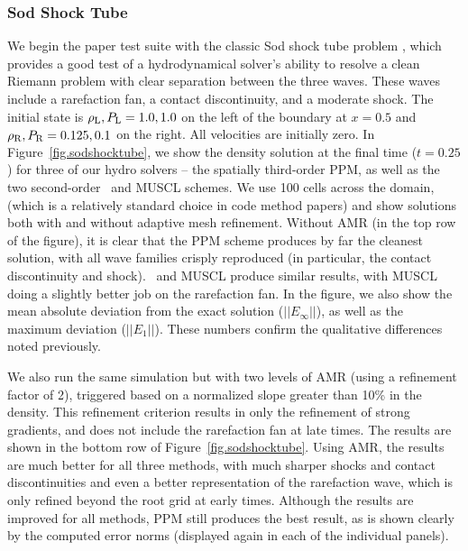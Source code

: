 \subsubsection{Sod Shock Tube}
\label{sec.tests.sodshock}

We begin the paper test suite with the classic Sod shock tube problem
\citep{Sod78}, which provides a good test of a hydrodynamical solver's
ability to resolve a clean Riemann problem with clear separation
between the three waves.  These waves include a rarefaction fan, a
contact discontinuity, and a moderate shock.  The initial state is 
$\rho_{\rm L}, P_{\rm L} = 1.0, 1.0$ on the left of the boundary at 
$x=0.5$ and $\rho_{\rm R}, P_{\rm R} = 0.125, 0.1$ on the right.
All velocities are initially zero.  In
Figure~\ref{fig.sodshocktube}, we show the density solution at the
final time ($t=0.25$) for three of our hydro solvers -- the spatially third-order
PPM, as well as the two second-order \zeus\ and MUSCL schemes.  We use
100 cells across the domain, (which is a relatively standard choice in
code method papers) and show solutions both with and without adaptive
mesh refinement.  Without AMR (in the top row of the figure), it is
clear that the PPM scheme produces by far the cleanest solution, with
all wave families crisply reproduced (in particular, the contact
discontinuity and shock).  \zeus\ and MUSCL produce similar results,
with MUSCL doing a slightly better job on the rarefaction fan.  In the
figure, we also show the mean absolute deviation from the exact
solution ($||E_\infty||$), as well as the maximum deviation
($||E_1||$).  These numbers confirm the qualitative differences noted
previously.

We also run the same simulation but with two levels of AMR (using a
refinement factor of 2), triggered based on a normalized slope greater
than 10\% in the density.  This refinement criterion results in only
the refinement of strong gradients, and
does not include the rarefaction fan at late times.  The results are
shown in the bottom row of Figure~\ref{fig.sodshocktube}.  Using AMR,
the results are much better for all three methods, with much sharper
shocks and contact discontinuities and even a better representation of
the rarefaction wave, which is only refined beyond the root grid at
early times.  Although the results are improved for all methods, PPM
still produces the best result, as is shown clearly by the computed
error norms (displayed again in each of the individual panels).

